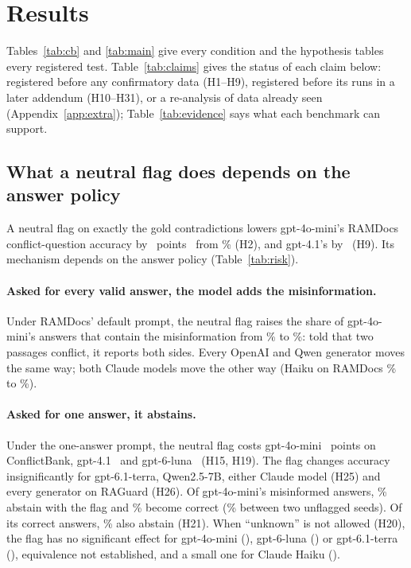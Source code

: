 \section{Results}
\label{sec:results}

Tables~\ref{tab:cb} and \ref{tab:main} give every condition and the hypothesis tables every registered test.
Table~\ref{tab:claims} gives the status of each claim below: registered before any confirmatory data (H1--H9), registered before its
runs in a later addendum (H10--H31), or a re-analysis of data already seen (Appendix~\ref{app:extra});
Table~\ref{tab:evidence} says what each benchmark can support.

\subsection{What a neutral flag does depends on the answer policy}
\label{sec:neutral}


A neutral flag on exactly the gold contradictions lowers gpt-4o-mini's RAMDocs conflict-question accuracy
by \adOracleFlagConf\ points \dOracleFlagConfCI\ from \plainConf\% (H2), and gpt-4.1's by \agptOracleFlagConf\ (H9).
Its mechanism depends on the answer policy (Table~\ref{tab:risk}).

\paragraph{Asked for every valid answer, the model adds the misinformation.} Under RAMDocs' default prompt,
the neutral flag raises the share of gpt-4o-mini's
answers that contain the misinformation from \zmRdMiniPlainWrong\% to \zmRdMiniOracleFlagWrong\%: told that two
passages conflict, it reports both sides. Every OpenAI and Qwen generator moves the same way; both Claude models move
the other way (Haiku on RAMDocs \zmRdHaikuPlainWrong\% to \zmRdHaikuOracleFlagWrong\%).

\paragraph{Asked for one answer, it abstains.} Under the one-answer prompt, the neutral
flag costs gpt-4o-mini \azSgMiniOracleFlagConflict\ points on ConflictBank, gpt-4.1 \azSgFourOracleFlagConflict\ and
gpt-6-luna \azSgLunaOracleFlagConflict\ (H15, H19). The flag changes accuracy insignificantly for gpt-6.1-terra,
Qwen2.5-7B, either Claude model (H25) and every generator on RAGuard (H26). Of gpt-4o-mini's misinformed answers, \trSgMiniNeutralMisinfoAbstain\% abstain with the flag and
\trSgMiniNeutralMisinfoCorrect\% become correct (\trNullSgMiniMisinfoCorrect\% between two unflagged seeds). Of its
correct answers, \trSgMiniNeutralCorrectAbstain\% also abstain (H21). When ``unknown'' is not allowed (H20), the flag has no
significant effect for gpt-4o-mini (\hTwentyFcMiniFlag), gpt-6-luna (\hTwentyFcLunaFlag) or gpt-6.1-terra
(\hTwentyFcTerraFlag), equivalence not established, and a small one for Claude Haiku (\hTwentyFcHaikuFlag).

